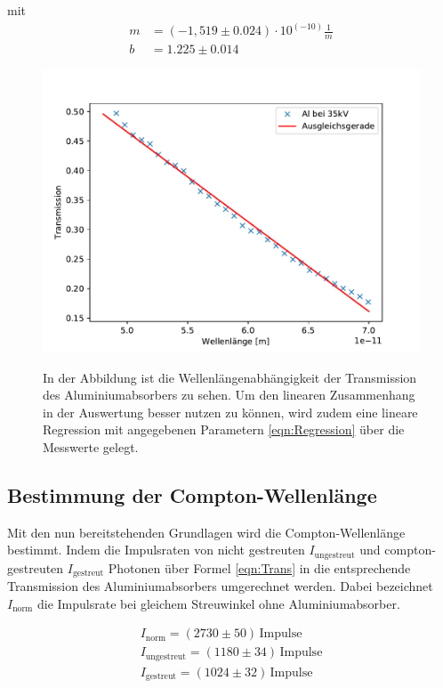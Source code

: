 \documentclass[titlepage = firstcover]{scrartcl}
\begin{document}
        \noindent
        mit
        \begin{align}
            m &= (-1,519 \pm 0.024) \cdot 10^{(-10)} \frac{1}{m} \\
            b &= 1.225 \pm 0.014
            \label{eqn:Parameter}
        \end{align}
        \FloatBarrier
        \begin{figure}[h]
            \centering
            \caption{In der Abbildung ist die Wellenlängenabhängigkeit der Transmission des Aluminiumabsorbers zu sehen. Um den linearen Zusammenhang in der Auswertung besser nutzen zu können, wird zudem eine lineare Regression mit angegebenen Parametern \ref{eqn:Regression} über die Messwerte gelegt.}
            \includegraphics[width = 0.9\linewidth]{Compton_Alu.pdf}
            \label{fig:Transmission}
        \end{figure}
        \FloatBarrier

        \subsection{Bestimmung der Compton-Wellenlänge}
        Mit den nun bereitstehenden Grundlagen wird die Compton-Wellenlänge bestimmt. Indem die Impulsraten von nicht gestreuten $I_{\text{ungestreut}}$ 
        und compton-gestreuten $I_{\text{gestreut}}$ Photonen über Formel \ref{eqn:Trans} in die entsprechende Transmission des Aluminiumabsorbers umgerechnet
        werden. Dabei bezeichnet $I_{\text{norm}}$ die Impulsrate bei gleichem Streuwinkel ohne Aluminiumabsorber. 

        \begin{align*}
            I_{\text{norm}} = (2730 \pm 50) \, \text{Impulse}\\
            I_{\text{ungestreut}} = (1180 \pm 34) \, \text{Impulse}\\
            I_{\text{gestreut}} = (1024 \pm 32) \, \text{Impulse}
        \end{align*}
        
\end{document}

